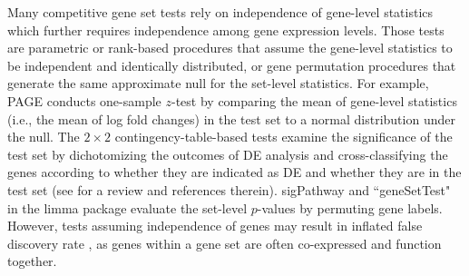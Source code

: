\documentclass[a4,center,fleqn]{NAR}
\newcommand{\gen}{geneSetTest}
\begin{document}
	Many competitive gene set tests rely on independence of gene-level statistics which further 
	requires  
	independence among gene expression levels. Those tests are parametric or rank-based procedures
	that assume the gene-level statistics to be independent and identically distributed, or gene
	permutation procedures that generate the same approximate null for the set-level statistics. For
	example, PAGE  \citep{kim2005page} conducts one-sample $z$-test by comparing the mean of gene-level
	statistics (i.e., the mean of log fold changes) in the test set to a normal distribution under the
	null. The $2\times 2$ contingency-table-based tests examine the significance of the test set by
	dichotomizing the outcomes of DE analysis and cross-classifying the genes according to whether they
	are indicated as DE and whether they are in the test set (see \cite{huang2009bioinformatics} for a
	review and references therein). sigPathway \citep{tian2005discovering} and ``\gen" in the limma
	package \citep{Smyth2004moderated} evaluate the set-level $p$-values by permuting gene labels.
	However, tests assuming independence of genes may result in inflated false discovery rate
	\citep{efron2007testing,goeman2007analyzing, gatti2010heading,wu2012camera,yaari2013quantitative},
	as genes within a gene set are often co-expressed and function together.
	
\end{document}
